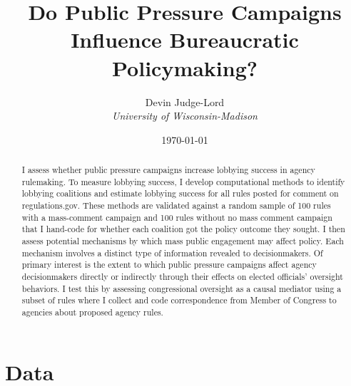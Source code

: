 \documentclass[
      12pt,
        ]{article}
\title{Do Public Pressure Campaigns Influence Bureaucratic Policymaking?}
\author{ %
            Devin Judge-Lord  \\ \emph{University of Wisconsin-Madison} 
            }
\date{\today}
\begin{document}
 


  \maketitle




  \begin{abstract}
    \noindent I assess whether public pressure campaigns increase lobbying success in agency rulemaking. To measure lobbying success, I develop computational methods to identify lobbying coalitions and estimate lobbying success for all rules posted for comment on regulations.gov. These methods are validated against a random sample of 100 rules with a mass-comment campaign and 100 rules without no mass comment campaign that I hand-code for whether each coalition got the policy outcome they sought. I then assess potential mechanisms by which mass public engagement may affect policy. Each mechanism involves a distinct type of information revealed to decisionmakers. Of primary interest is the extent to which public pressure campaigns affect agency decisionmakers directly or indirectly through their effects on elected officials' oversight behaviors. I test this by assessing congressional oversight as a causal mediator using a subset of rules where I collect and code correspondence from Member of Congress to agencies about proposed agency rules. 

    
  \end{abstract}










\noindent 
      \doublespacing 
    \hypertarget{data}{%
\section{Data}\label{data}}
\end{document}
